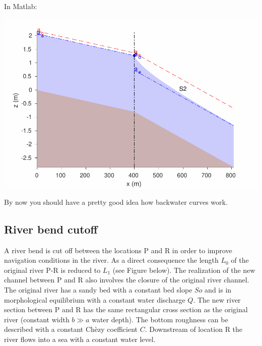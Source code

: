 \documentclass[a4paper]{article}
\begin{document}
\begin{solution}
    In Matlab:
    
    \includegraphics[width=\linewidth]{matlab/riv_eng_4.pdf}
    
\end{solution}

By now you should have a pretty good idea how backwater curves work.

\subsection{River bend cutoff}
	A river bend is cut off between the locations P and R in order to improve navigation conditions in the river. As a direct consequence the length $L_0$ of the original river P-R is reduced to $L_1$ (see Figure below).  The realization of the new channel between P and R also involves the closure of the original river channel. The original river has a sandy bed with a constant bed slope $So$ and is in morphological equilibrium with a constant water discharge $Q$. The new river section between P and R has the same rectangular cross section as the original river (constant width $b\gg a$  water depth). The bottom roughness can be described with a constant Ch\`ezy coefficient $C$.  Downstream of location R the river flows into a sea with a constant water level. 
\end{document}
